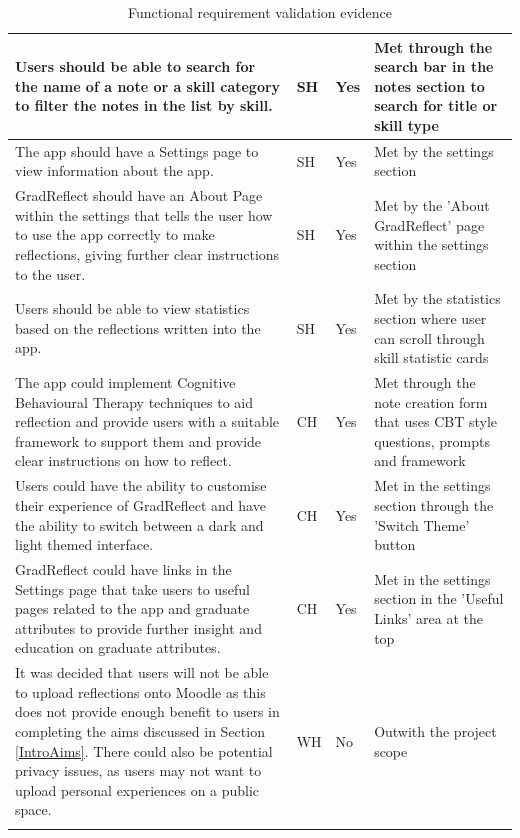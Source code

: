 \documentclass{l4proj}
\begin{document}
\begin{appendices}
\begin{center}
\begin{longtable}{| m{} | m{}| m{} | m{} |}
    \hline
    Users should be able to search for the name of a note or a skill category to filter the notes in the list by skill. & SH & Yes & Met through the search bar in the notes section to search for title or skill type \\ [1ex] 
    \hline
    The app should have a Settings page to view information about the app. & SH & Yes & Met by the settings section \\ [1ex] 
    \hline
    GradReflect should have an About Page within the settings that tells the user how to use the app correctly to make reflections, giving further clear instructions to the user. & SH & Yes & Met by the 'About GradReflect' page within the settings section \\ [1ex] 
    \hline
    Users should be able to view statistics based on the reflections written into the app. & SH & Yes & Met by the statistics section where user can scroll through skill statistic cards \\ [1ex] 
    \hline
    The app could implement Cognitive Behavioural Therapy techniques to aid reflection and provide users with a suitable framework to support them and provide clear instructions on how to reflect. & CH & Yes & Met through the note creation form that uses CBT style questions, prompts and framework \\ [1ex] 
    \hline
    Users could have the ability to customise their experience of GradReflect and have the ability to switch between a dark and light themed interface. & CH & Yes & Met in the settings section through the 'Switch Theme' button \\ [1ex] 
    \hline
    GradReflect could have links in the Settings page that take users to useful pages related to the app and graduate attributes to provide further insight and education on graduate attributes. & CH & Yes & Met in the settings section in the 'Useful Links' area at the top \\ [1ex] 
    \hline
    It was decided that users will not be able to upload reflections onto Moodle as this does not provide enough benefit to users in completing the aims discussed in Section \ref{IntroAims}. There could also be potential privacy issues, as users may not want to upload personal experiences on a public space. & WH & No & Outwith the project scope \\ [1ex] 
    \hline
    \caption{Functional requirement validation evidence} 
    \label{tab:RequirementsVerificationTable}
   \end{longtable}
   \end{center}



\end{appendices}
\end{document}
